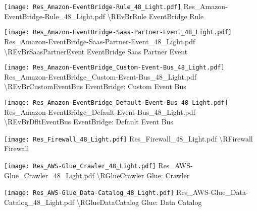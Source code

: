  {\texttt{[image: Res\_Amazon-EventBridge-Rule\_48\_Light.pdf]}} {Res\_Amazon-EventBridge-Rule\_48\_Light.pdf} {{\textbackslash}REvBrRule} {EventBridge Rule}

 {\texttt{[image: Res\_Amazon-EventBridge-Saas-Partner-Event\_48\_Light.pdf]}} {Res\_Amazon-EventBridge-Saas-Partner-Event\_48\_Light.pdf} {{\textbackslash}REvBrSaasPartnerEvent} {EventBridge Saas Partner Event}

 {\texttt{[image: Res\_Amazon-EventBridge\_Custom-Event-Bus\_48\_Light.pdf]}} {Res\_Amazon-EventBridge\_Custom-Event-Bus\_48\_Light.pdf} {{\textbackslash}REvBrCustomEventBus} {EventBridge: Custom Event Bus}

 {\texttt{[image: Res\_Amazon-EventBridge\_Default-Event-Bus\_48\_Light.pdf]}} {Res\_Amazon-EventBridge\_Default-Event-Bus\_48\_Light.pdf} {{\textbackslash}REvBrDfltEventBus} {EventBridge: Default Event Bus}

 {\texttt{[image: Res\_Firewall\_48\_Light.pdf]}} {Res\_Firewall\_48\_Light.pdf} {{\textbackslash}RFirewall} {Firewall}

 {\texttt{[image: Res\_AWS-Glue\_Crawler\_48\_Light.pdf]}} {Res\_AWS-Glue\_Crawler\_48\_Light.pdf} {{\textbackslash}RGlueCrawler} {Glue: Crawler}

 {\texttt{[image: Res\_AWS-Glue\_Data-Catalog\_48\_Light.pdf]}} {Res\_AWS-Glue\_Data-Catalog\_48\_Light.pdf} {{\textbackslash}RGlueDataCatalog} {Glue: Data Catalog}

